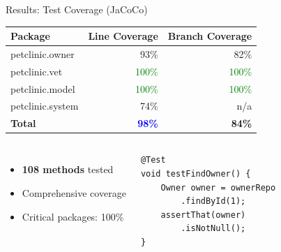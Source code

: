 \documentclass[aspectratio=169]{beamer}
\begin{document}
\begin{frame}{Results: Test Coverage (JaCoCo)}
\begin{table}[h]
\centering
\small
\begin{tabular}{lrr}
\toprule
\textbf{Package} & \textbf{Line Coverage} & \textbf{Branch Coverage} \\
\midrule
petclinic.owner & 93\% & 82\% \\
petclinic.vet & \textcolor{green}{100\%} & \textcolor{green}{100\%} \\
petclinic.model & \textcolor{green}{100\%} & \textcolor{green}{100\%} \\
petclinic.system & 74\% & n/a \\
\midrule
\textbf{Total} & \textbf{\textcolor{blue}{98\%}} & \textbf{84\%} \\
\bottomrule
\end{tabular}
\end{table}

\begin{columns}
\begin{itemize}
    \item \textbf{108 methods} tested
    \item Comprehensive coverage
    \item Critical packages: 100\%
\end{itemize}

\begin{lstlisting}[style=javastyle, basicstyle=\ttfamily\tiny]
@Test
void testFindOwner() {
    Owner owner = ownerRepo
        .findById(1);
    assertThat(owner)
        .isNotNull();
}
\end{lstlisting}
\end{columns}
\end{frame}
\end{document}
